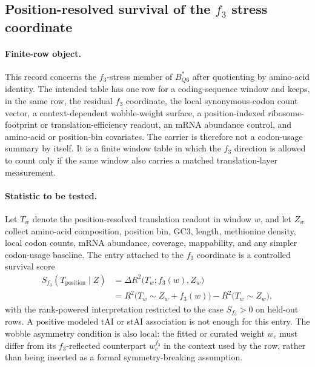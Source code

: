 \subsection{Position-resolved survival of the $f_3$ stress coordinate}\label{subsec:q6-f3-stress-position-resolved-translation-survival-cross-layer}

\paragraph{Finite-row object.}
This record concerns the $f_3$-stress member of $B^{\ast}_{Q6}$ after quotienting by amino-acid identity.  The intended table has one row for a coding-sequence window and keeps, in the same row, the residual $f_3$ coordinate, the local synonymous-codon count vector, a context-dependent wobble-weight surface, a position-indexed ribosome-footprint or translation-efficiency readout, an mRNA abundance control, and amino-acid or position-bin covariates.  The carrier is therefore not a codon-usage summary by itself.  It is a finite window table in which the $f_3$ direction is allowed to count only if the same window also carries a matched translation-layer measurement.

\paragraph{Statistic to be tested.}
Let $T_{w}$ denote the position-resolved translation readout in window $w$, and let $Z_w$ collect amino-acid composition, position bin, GC3, length, methionine density, local codon counts, mRNA abundance, coverage, mappability, and any simpler codon-usage baseline.  The entry attached to the $f_3$ coordinate is a controlled survival score
$$
\begin{aligned}
S_{f_3}(T_{\mathrm{position}}\mid Z)
  &= \Delta R^2\bigl(T_w; f_3(w), Z_w\bigr)\\
  &= R^2\bigl(T_w \sim Z_w + f_3(w)\bigr) - R^2\bigl(T_w \sim Z_w\bigr),
\end{aligned}
$$
with the rank-powered interpretation restricted to the case $S_{f_3}>0$ on held-out rows.  A positive modeled tAI or stAI association is not enough for this entry.  The wobble asymmetry condition is also local: the fitted or curated weight $w_c$ must differ from its $f_3$-reflected counterpart $w_c^{f_3}$ in the context used by the row, rather than being inserted as a formal symmetry-breaking assumption.

